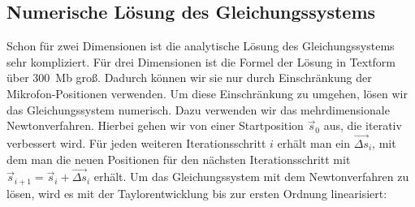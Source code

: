 \subsection{Numerische Lösung des Gleichungssystems}
Schon für zwei Dimensionen ist die analytische Lösung des Gleichungssystems sehr kompliziert. Für drei Dimensionen ist die Formel der Lösung in Textform über \num{300}~Mb groß. Dadurch können wir sie nur durch Einschränkung der Mikrofon-Positionen verwenden. Um diese Einschränkung zu umgehen, lösen wir das Gleichungssystem numerisch. Dazu verwenden wir das mehrdimensionale Newtonverfahren. Hierbei gehen wir von einer Startposition $\vec{s}_0$ aus, die iterativ verbessert wird.
Für jeden weiteren Iterationsschritt $i$ erhält man ein $\vec{\Delta{s}}_i$, mit dem man die neuen Positionen für den nächsten Iterationsschritt mit $\vec{s}_{i + 1} = \vec{s}_i + \vec{\Delta{s}}_i$ erhält.
Um das Gleichungssystem mit dem Newtonverfahren zu lösen, wird es mit der Taylorentwicklung bis zur ersten Ordnung linearisiert:

